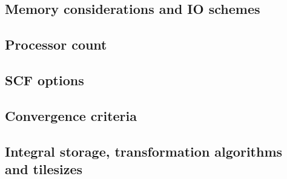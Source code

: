 \subsection{Memory considerations and IO schemes}

\subsection{Processor count}

\subsection{SCF options}

\subsection{Convergence criteria}

\subsection{Integral storage, transformation algorithms and tilesizes}


